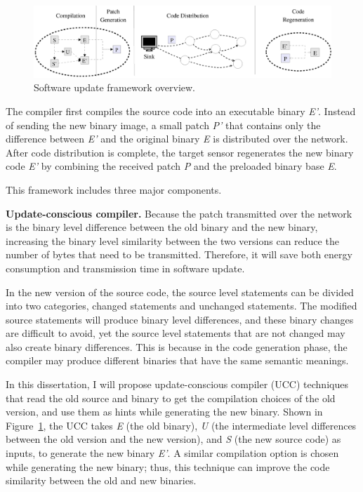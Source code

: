 \begin{figure}[htbp]
	\centering
		\includegraphics[scale=0.45]{figures/model.eps}
	\caption{Software update framework overview.}
	\vspace{-0.2in}
	\label{fig:overview}
\end{figure}


The compiler first compiles the source code into an executable binary {\it E'}. 
Instead of sending the new binary image, a small patch {\it P'} that contains only the difference between {\it E'} and 
the original binary {\it E} is distributed over the network.  After code distribution is complete, the target sensor 
regenerates the new binary code {\it E'} by combining the received patch {\it P} and the preloaded binary base {\it E}. 

This framework includes three major components.

\textbf{Update-conscious compiler.} 
Because the patch transmitted over the network is the binary level difference between the old binary and the new  
binary, increasing the binary level similarity between the two versions can reduce the number of bytes that need to be 
transmitted. Therefore, it will save both energy consumption and transmission time in software update. 


In the new version of the source code, the source level statements can be divided into two categories, changed 
statements and unchanged statements.  The modified source statements will produce binary level differences, and these 
binary changes are difficult to avoid, yet the source level statements that are not changed may also create binary 
differences.
This is because in the code generation phase, the compiler may produce different binaries that have the same semantic 
meanings.

In this dissertation, I will propose update-conscious compiler (UCC) techniques that read the old source and binary to 
get the compilation choices of the old version, and use them as hints while generating the new binary. 
Shown in Figure~\ref{fig:overview}, the UCC takes {\it E} (the old binary), {\it U} (the intermediate level differences 
between the old version and the new version), and {\it S} (the new source code) as inputs, to generate the new binary 
{\it E'}. A similar compilation option is chosen while generating the new binary; thus, this technique can improve the 
code similarity between the old and new binaries.

